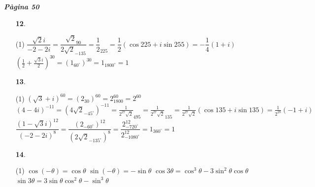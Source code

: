 \documentclass[a4paper, pdf, twoside]{book}
\begin{document}
\begin{multicols}{2}

{\textbf{\em Pàgina 50}} \hrulefill
\begin{enumerate}
\vspace{0.25cm}



 \item[\fontfamily{phv}\selectfont\color{blue}\textbf{12}. ] 
 \begin{tasks}[column-sep=1em, item-indent=1.3333em](1)
	 \task* $\dfrac {\sqrt {2} i}{-2-2i}=\dfrac {\sqrt {2}_{90}}{2\sqrt {2}_{-135}}=\dfrac {1}{2}_{225}=\dfrac {1}{2} (\cos 225 + i \sin 255)=-\dfrac {1}{4}(1+i)$
	 \task* $\left (\frac {1}{2} + \frac {\sqrt {3}i}{2}\right )^{30}=\left ( 1_{60^\circ } \right )^{30}= 1_{1800^\circ }=1$ 
\end{tasks}
 \end{enumerate}
\begin{enumerate}
\vspace{0.25cm}



 \item[\fontfamily{phv}\selectfont\color{blue}\textbf{13}. ] 
 \begin{tasks}[column-sep=1em, item-indent=1.3333em](1)
	 \task* $(\sqrt {3}+i)^{60}=(2_{30})^{60}=2^{60}_{1800}=2^{60}$
	 \task* $(4-4i)^{-11}=(4\sqrt {2}_{-45^\circ })^{-11}=\frac {1}{2^{27}\sqrt {2}}_{495}=\frac {1}{2^{27}\sqrt {2}}_{135}=\frac {1}{2^{27}\sqrt {2}}(\cos 135 + i \sin 135)=\frac {1}{2^{28}} (-1+i)$
	 \task* $\dfrac {(1-\sqrt {3} i)^{12}}{(-2-2i)^8}=\dfrac {(2_{-60^\circ })^{12}}{(2\sqrt {2}_{-135^\circ })^8}= \dfrac {2^{12}_{-720^\circ }}{2^{12}_{-1080^\circ }}=1_{360^\circ }=1$
\end{tasks}
\vspace{0.25cm}



 \item[\fontfamily{phv}\selectfont\color{blue}\textbf{14}. ] 
 \begin{tasks}[column-sep=1em, item-indent=1.3333em](1)
	 \task $\cos (-\theta )=\cos \theta $
	 \task* $\sin (-\theta )=-\sin \theta $
	 \task* $\cos 3\theta =\cos ^3 \theta - 3\sin ^2 \theta \cos \theta $
	 \task* $\sin 3\theta =3\sin \theta \cos ^2 \theta - \sin ^3\theta $
\end{tasks}
\vspace{0.25cm}




\end{enumerate}
\end{multicols}
\end{document}
